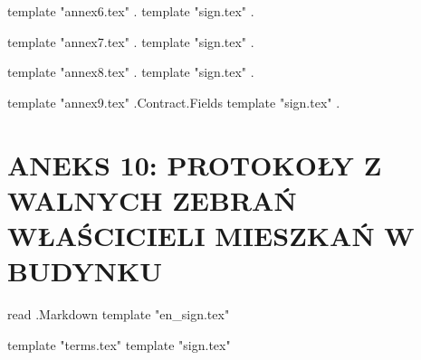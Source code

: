 {{template "annex6.tex" .}} %
{{template "sign.tex" .}} %

{{template "annex7.tex" .}} %
{{template "sign.tex" .}} %

{{template "annex8.tex" .}} %
{{template "sign.tex" .}} %

{{template "annex9.tex" .Contract.Fields}} %
{{template "sign.tex" .}} %

\pagebreak
\section{ANEKS 10: PROTOKOŁY Z WALNYCH ZEBRAŃ WŁAŚCICIELI MIESZKAŃ W BUDYNKU}
{{read .Markdown}} %
{{template "en_sign.tex"}} %
\FloatBarrier{}\mbox{}\vfill\pagebreak %

{{template "terms.tex"}} %
{{template "sign.tex"}} %

